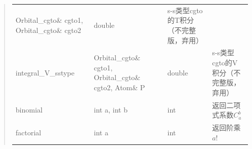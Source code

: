 \documentclass[11pt]{article}
\begin{document}
\begin{quote}
\begin{longtable}[]{@{}llll@{}}
\begin{minipage}[t]{0.37\columnwidth}
Orbital\_cgto\& cgto1, Orbital\_cgto\& cgto2\strut
\end{minipage} & \begin{minipage}[t]{0.07\columnwidth}\raggedright\strut
double\strut
\end{minipage} & \begin{minipage}[t]{0.27\columnwidth}\raggedright\strut
s-s类型cgto的T积分（不完整版，弃用）\strut
\end{minipage}\tabularnewline
\begin{minipage}[t]{0.17\columnwidth}\raggedright\strut
integral\_V\_sstype\strut
\end{minipage} & \begin{minipage}[t]{0.37\columnwidth}\raggedright\strut
Orbital\_cgto\& cgto1, Orbital\_cgto\& cgto2, Atom\& P\strut
\end{minipage} & \begin{minipage}[t]{0.07\columnwidth}\raggedright\strut
double\strut
\end{minipage} & \begin{minipage}[t]{0.27\columnwidth}\raggedright\strut
s-s类型cgto的V积分（不完整版，弃用）\strut
\end{minipage}\tabularnewline
\begin{minipage}[t]{0.17\columnwidth}\raggedright\strut
binomial\strut
\end{minipage} & \begin{minipage}[t]{0.37\columnwidth}\raggedright\strut
int a, int b\strut
\end{minipage} & \begin{minipage}[t]{0.07\columnwidth}\raggedright\strut
int\strut
\end{minipage} & \begin{minipage}[t]{0.27\columnwidth}\raggedright\strut
返回二项式系数\(C_a^b\)\strut
\end{minipage}\tabularnewline
\begin{minipage}[t]{0.17\columnwidth}\raggedright\strut
factorial\strut
\end{minipage} & \begin{minipage}[t]{0.37\columnwidth}\raggedright\strut
int a\strut
\end{minipage} & \begin{minipage}[t]{0.07\columnwidth}\raggedright\strut
int\strut
\end{minipage} & \begin{minipage}[t]{0.27\columnwidth}\raggedright\strut
返回阶乘\(a!\)\strut
\end{minipage}\tabularnewline

\end{longtable}
\end{quote}
\end{document}
